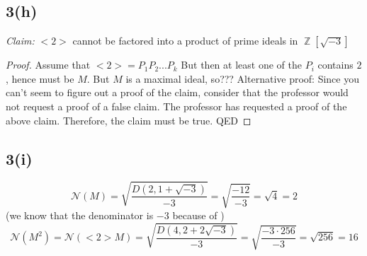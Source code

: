 \documentclass{article}
\DeclareMathOperator{\Z}{\mathbb{Z}}
\begin{document}
\subsection*{3(h)}
\textit{Claim:} $<2>$ cannot be factored into a product of prime ideals in $\Z[\sqrt{-3}]$
\begin{proof}
	Assume that $<2> = P_1P_2...P_k$  But then at least one of the $P_i$ contains $2$, hence must be $M$.  But $M$ is a maximal ideal, so???
	Alternative proof:
	Since you can't seem to figure out a proof of the claim, consider that the professor would not request a proof of a false claim.  The professor has requested a proof of the above claim.  Therefore, the claim must be true.  QED
\end{proof}
\subsection*{3(i)}
$$\mathscr{N}(M) = \sqrt{\frac{D(2,1+\sqrt{-3})}{-3}} = \sqrt{\frac{-12}{-3}}=\sqrt{4}=2$$  (we know that the denominator is $-3$ because of \cite[7.1.2]{alacas.williamsk.s.2004})
$$\mathscr{N}(M^2) = \mathscr{N}(<2>M) = \sqrt{\frac{D(4,2+2\sqrt{-3})}{-3}} = \sqrt{\frac{-3\cdot 256}{-3}} = \sqrt{256} = 16$$


\end{document}
